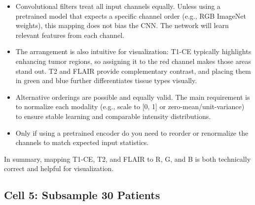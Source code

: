 \begin{itemize}
    \item Convolutional filters treat all input channels equally. Unless using a pretrained model that expects a specific channel order (e.g., RGB ImageNet weights), this mapping does not bias the CNN. The network will learn relevant features from each channel.
    \item The arrangement is also intuitive for visualization: T1-CE typically highlights enhancing tumor regions, so assigning it to the red channel makes those areas stand out. T2 and FLAIR provide complementary contrast, and placing them in green and blue further differentiates tissue types visually.
    \item Alternative orderings are possible and equally valid. The main requirement is to normalize each modality (e.g., scale to [0, 1] or zero-mean/unit-variance) to ensure stable learning and comparable intensity distributions.
    \item Only if using a pretrained encoder do you need to reorder or renormalize the channels to match expected input statistics.
\end{itemize}

\noindent In summary, mapping T1-CE, T2, and FLAIR to R, G, and B is both technically correct and helpful for visualization.

\clearpage

\subsection{Cell 5: Subsample 30 Patients}

